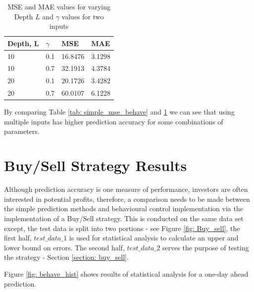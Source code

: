 \begin{table}[h]
\begin{center}
    \begin{tabular}{|l|l|l|l|}
    \hline
    Depth, L & $\gamma$ & MSE     & MAE    \\ \hline
    10       & 0.1                   & 16.8476 & 3.1298 \\ \hline
    10       & 0.7                   & 32.1913 & 4.3784 \\ \hline
    20       & 0.1                   & 20.1726 & 3.4282 \\ \hline
    20       & 0.7                   & 60.0107 & 6.1228 \\ \hline
    \end{tabular}
\end{center}
\caption{MSE and MAE values for varying Depth $L$ and $\gamma$ values for two inputs}
\label{tab: mse_price_vol}
\end{table}

\noindent By comparing Table \ref{tab: simple_mse_behave} and \ref{tab: mse_price_vol} we can see that using multiple inputs has higher prediction accuracy for some combinations of parameters.

\clearpage

\section{Buy/Sell Strategy Results}

\noindent Although prediction accuracy is one measure of performance, investors are often interested in potential profits, therefore, a comparison needs to be made between the simple prediction methods and behavioural control implementation via the implementation of a Buy/Sell strategy. This is conducted on the same data set except, the test data is split into two portions - see Figure \ref{fig: Buy_sell},  the first half, $test\_data\_1$ is used for statistical analysis to calculate an upper and lower bound on errors. The second half, $test\_data\_2$ serves the purpose of testing the strategy - Section \ref{section: buy_sell}.

\noindent Figure \ref{fig: behave_hist} shows results of  statistical analysis for a one-day ahead prediction.


